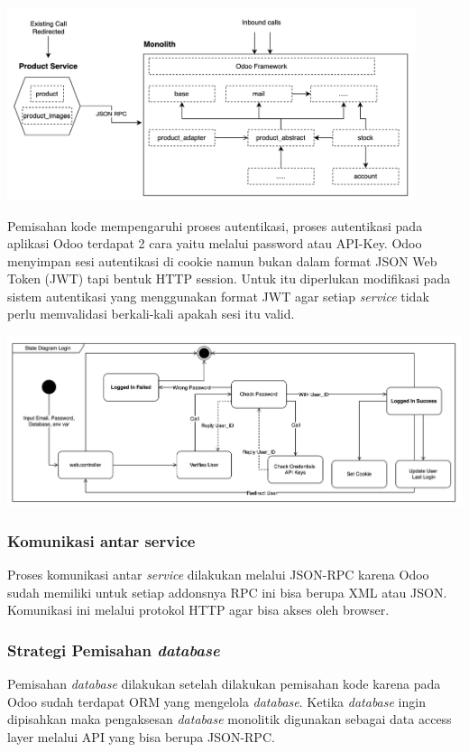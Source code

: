 \begin{center}
	\includegraphics[width=12cm]{img/bab_3/strangelExMicro.png}
	\label{fig:asd}
\end{center}

Pemisahan kode mempengaruhi proses autentikasi, proses autentikasi pada aplikasi Odoo terdapat 2 cara yaitu melalui password atau API-Key. Odoo menyimpan sesi autentikasi di cookie namun bukan dalam format JSON Web Token (JWT) tapi bentuk HTTP session. Untuk itu diperlukan modifikasi pada sistem autentikasi yang menggunakan format JWT agar setiap \textit{service} tidak perlu memvalidasi berkali-kali apakah sesi itu valid. 

\begin{center}
	\includegraphics[width=14cm]{img/bab_3/stateDiagramLogin.png}
	\label{fig:asd}
\end{center}


\subsubsection{Komunikasi antar service}
Proses komunikasi antar \textit{service} dilakukan melalui JSON-RPC karena Odoo sudah memiliki untuk setiap addonsnya RPC ini bisa berupa XML atau JSON. Komunikasi ini melalui protokol  HTTP agar bisa akses oleh browser.  
\\
\subsubsection{Strategi Pemisahan \textit{database}}
Pemisahan \textit{database} dilakukan setelah dilakukan pemisahan kode karena pada Odoo sudah terdapat ORM yang mengelola \textit{database}. Ketika \textit{database} ingin dipisahkan maka pengaksesan \textit{database} monolitik  digunakan sebagai data access layer melalui API yang bisa berupa JSON-RPC.
\\ 

